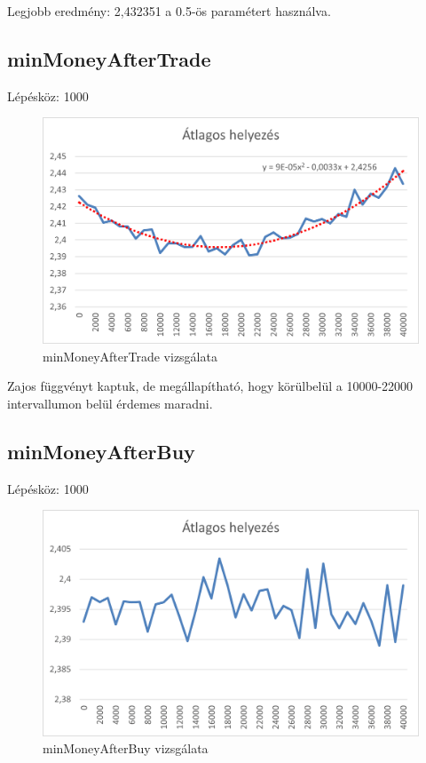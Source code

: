 Legjobb eredmény:  2,432351 a 0.5-ös paramétert használva.
\newpage
\subsection{minMoneyAfterTrade}
Lépésköz: 1000
\begin{figure}[h!]
\centering
\includegraphics[scale=0.2]{images/aaaaaaaaa.png}
\caption{minMoneyAfterTrade vizsgálata}
\label{fig:ff}
\end{figure}

Zajos függvényt kaptuk, de megállapítható, hogy körülbelül a 10000-22000 intervallumon belül érdemes maradni.

\subsection{minMoneyAfterBuy}
Lépésköz: 1000
\begin{figure}[h!]
\centering
\includegraphics[scale=0.2]{images/fdgd.png}
\caption{minMoneyAfterBuy vizsgálata}
\label{fig:ff}
\end{figure}

